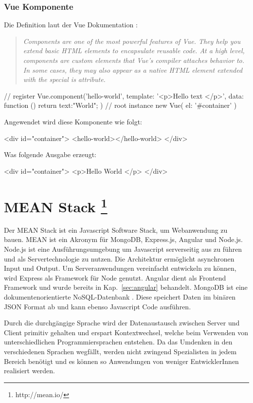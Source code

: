 \subsubsection{Vue Komponente}
Die Definition laut der Vue Dokumentation \cite{vue-component}: 
\begin{quote}
	\begin{english}
		\textit{Components are one of the most powerful features of Vue. They help you extend basic HTML elements to encapsulate reusable code. At a high level, components are custom elements that Vue’s compiler attaches behavior to. In some cases, they may also appear as a native HTML element extended with the special is attribute.}
	\end{english}
\end{quote}

\begin{JsCode}
	// register
	Vue.component('hello-world', {
		template: '<p>Hello {{ text }} </p>',
		data: function () {
			return {text:"World"};
		}
	})
	// root instance
	new Vue({
		el: '#container'
	})
\end{JsCode}
Angewendet wird diese Komponente wie folgt:
\begin{JsCode}[numbers=none]
	<div id="container">
	<hello-world></hello-world>
	</div>
\end{JsCode}
Was folgende Ausgabe erzeugt:
\begin{JsCode}[numbers=none]
	<div id="container">
	<p>Hello World </p>
	</div>
\end{JsCode}

\section%
{MEAN Stack%
	\protect\footnote{http://mean.io/}}%

Der MEAN Stack ist ein Javascript Software Stack, um Webanwendung zu bauen. MEAN ist ein Akronym für MongoDB, Express.js, Angular und Node.js. 
Node.js ist eine Ausführungsumgebung um Javascript serverseitig aus zu führen und als Servertechnologie zu nutzen. Die Architektur ermöglicht asynchronen Input und Output. Um Serveranwendungen vereinfacht entwickeln zu können, wird Express als Framework für Node genutzt. 
Angular dient als Frontend Framework und wurde bereits in Kap.~\ref{sec:angular} behandelt. MongoDB ist eine dokumentenorientierte NoSQL-Datenbank \cite{noSQL}. Diese speichert Daten im binären JSON Format ab und kann ebenso Javascript Code ausführen.

Durch die durchgängige Sprache wird der Datenaustausch zwischen Server und Client primitiv gehalten und erspart Kontextwechsel, welche beim Verwenden von unterschiedlichen Programmiersprachen entstehen. Da das Umdenken in den verschiedenen Sprachen wegfällt, werden nicht zwingend Spezialisten in jedem Bereich benötigt und es können so Anwendungen von weniger EntwicklerInnen realisiert werden. 
